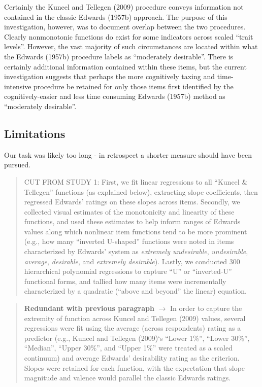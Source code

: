 \documentclass[
  ,jou]{apa6}
\begin{document}
Certainly the Kuncel and Tellegen (2009) procedure conveys information not contained in the classic Edwards (1957b) approach. The purpose of this investigation, however, was to document overlap between the two procedures. Clearly nonmonotonic functions do exist for some indicators across scaled ``trait levels''. However, the vast majority of such circumstances are located within what the Edwards (1957b) procedure labels as ``moderately desirable''. There is certainly additional information contained within these items, but the current investigation suggests that perhaps the more cognitively taxing and time-intensive procedure be retained for only those items first identified by the cognitively-easier and less time consuming Edwards (1957b) method as ``moderately desirable''.

\hypertarget{limitations}{%
\subsection{Limitations}\label{limitations}}

Our task was likely too long - in retrospect a shorter measure should have been pursued.

\begin{quote}
CUT FROM STUDY 1: First, we fit linear regressions to all ``Kuncel \& Tellegen'' functions (as explained below), extracting slope coefficients, then regressed Edwards' ratings on these slopes across items. Secondly, we collected visual estimates of the monotonicity and linearity of these functions, and used these estimates to help inform ranges of Edwards values along which nonlinear item functions tend to be more prominent (e.g., how many ``inverted U-shaped'' functions were noted in items characterized by Edwards' system as \emph{extremely undesirable}, \emph{undesirable}, \emph{average}, \emph{desirable}, and \emph{extremely desirable}). Lastly, we conducted 300 hierarchical polynomial regressions to capture ``U'' or ``inverted-U'' functional forms, and tallied how many items were incrementally characterized by a quadratic (``above and beyond'' the linear) equation.
\end{quote}

\begin{quote}
\textbf{Redundant with previous paragraph} \(\rightarrow\) In order to capture the extremity of function across Kuncel and Tellegen (2009) values, several regressions were fit using the average (across respondents) rating as a predictor (e.g., Kuncel and Tellegen (2009)`s ``Lower 1\%'', ``Lower 30\%'', ``Median'', ``Upper 30\%'', and ``Upper 1\%'' were treated as a scaled continuum) and average Edwards' desirability rating as the criterion. Slopes were retained for each function, with the expectation that slope magnitude and valence would parallel the classic Edwards ratings.
\end{quote}
\end{document}
